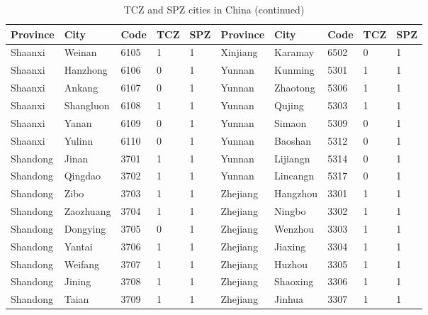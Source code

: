 \documentclass[12pt]{article}
\begin{document}
\begin{table}[!htb] \centering
  \caption{TCZ and SPZ cities in China (continued)}
  \begin{adjustbox}{width=\textwidth, totalheight=\baselineskip,keepaspectratio}
    \label{tab:appendix3}
\begin{tabular}{llllllllll}
\hline
Province       & City         & Code & TCZ & SPZ & Province & City        & Code & TCZ & SPZ \\
\hline
Shaanxi  & Weinan    & 6105           & 1   & 1   & Xinjiang & Karamay  & 6502           & 0   & 1   \\
Shaanxi  & Hanzhong  & 6106           & 0   & 1   & Yunnan   & Kunming  & 5301           & 1   & 1   \\
Shaanxi  & Ankang    & 6107           & 0   & 1   & Yunnan   & Zhaotong & 5306           & 1   & 1   \\
Shaanxi  & Shangluon & 6108           & 1   & 1   & Yunnan   & Qujing   & 5303           & 1   & 1   \\
Shaanxi  & Yanan     & 6109           & 0   & 1   & Yunnan   & Simaon   & 5309           & 0   & 1   \\
Shaanxi  & Yulinn    & 6110           & 0   & 1   & Yunnan   & Baoshan  & 5312           & 0   & 1   \\
Shandong & Jinan     & 3701           & 1   & 1   & Yunnan   & Lijiangn & 5314           & 0   & 1   \\
Shandong & Qingdao   & 3702           & 1   & 1   & Yunnan   & Lincangn & 5317           & 0   & 1   \\
Shandong & Zibo      & 3703           & 1   & 1   & Zhejiang & Hangzhou & 3301           & 1   & 1   \\
Shandong & Zaozhuang & 3704           & 1   & 1   & Zhejiang & Ningbo   & 3302           & 1   & 1   \\
Shandong & Dongying  & 3705           & 0   & 1   & Zhejiang & Wenzhou  & 3303           & 1   & 1   \\
Shandong & Yantai    & 3706           & 1   & 1   & Zhejiang & Jiaxing  & 3304           & 1   & 1   \\
Shandong & Weifang   & 3707           & 1   & 1   & Zhejiang & Huzhou   & 3305           & 1   & 1   \\
Shandong & Jining    & 3708           & 1   & 1   & Zhejiang & Shaoxing & 3306           & 1   & 1   \\
Shandong & Taian     & 3709           & 1   & 1   & Zhejiang & Jinhua   & 3307           & 1   & 1   \\

\end{tabular}
\end{adjustbox}
\end{table}
\end{document}
